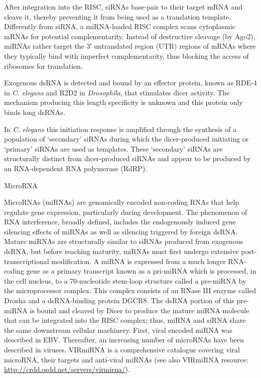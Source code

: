 After integration into the RISC, siRNAs base-pair to their target mRNA and cleave it, thereby preventing it from being used as a translation template. Differently from siRNA, a miRNA-loaded RISC complex scans cytoplasmic mRNAs for potential complementarity. Instead of destructive cleavage (by Ago2), miRNAs rather target the 3′ untranslated region (UTR) regions of mRNAs where they typically bind with imperfect complementarity, thus blocking the access of ribosomes for translation.

Exogenous dsRNA is detected and bound by an effector protein, known as RDE-4 in \emph{C. elegans} and R2D2 in \emph{Drosophila}, that stimulates dicer activity. The mechanism producing this length specificity is unknown and this protein only binds long dsRNAs.

In \emph{C. elegans} this initiation response is amplified through the synthesis of a population of `secondary' siRNAs during which the dicer-produced initiating or `primary' siRNAs are used as templates. These `secondary' siRNAs are structurally distinct from dicer-produced siRNAs and appear to be produced by an RNA-dependent RNA polymerase (RdRP).

MicroRNA

MicroRNAs (miRNAs) are genomically encoded non-coding RNAs that help regulate gene expression, particularly during development. The phenomenon of RNA interference, broadly defined, includes the endogenously induced gene silencing effects of miRNAs as well as silencing triggered by foreign dsRNA. Mature miRNAs are structurally similar to siRNAs produced from exogenous dsRNA, but before reaching maturity, miRNAs must first undergo extensive post-transcriptional modification. A miRNA is expressed from a much longer RNA-coding gene as a primary transcript known as a pri-miRNA which is processed, in the cell nucleus, to a 70-nucleotide stem-loop structure called a pre-miRNA by the microprocessor complex. This complex consists of an RNase III enzyme called Drosha and a dsRNA-binding protein DGCR8. The dsRNA portion of this pre-miRNA is bound and cleaved by Dicer to produce the mature miRNA molecule that can be integrated into the RISC complex; thus, miRNA and siRNA share the same downstream cellular machinery. First, viral encoded miRNA was described in EBV. Thereafter, an increasing number of microRNAs have been described in viruses. VIRmiRNA is a comprehensive catalogue covering viral microRNA, their targets and anti-viral miRNAs (see also VIRmiRNA resource: \url{http://crdd.osdd.net/servers/virmirna/}).

